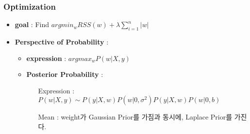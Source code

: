 \documentclass{article}
\begin{document}
\subsubsection{Optimization}
\begin{itemize}
    \item \textbf{goal} : Find $argmin_w RSS(w)+\lambda\sum_{i=1}^{n}{|w|}$
    \item \textbf{Perspective of Probability} : 
         \begin{itemize}
             \item \textbf{expression} : $argmax_w P(w|X,y)$
             \item \textbf{Posterior Probability} : 
                \begin{itemize}
                    \item[Expression] : $P(w|X,y) \sim P(y|X,w)P(w|0,\sigma^2)P(y|X,w)P(w|0,b)$
                    \item[Mean] : weight가 Gaussian Prior를 가짐과 동시에, Laplace Prior를 가진다.
                \end{itemize}
             

\end{itemize}
\end{itemize}
\end{document}
